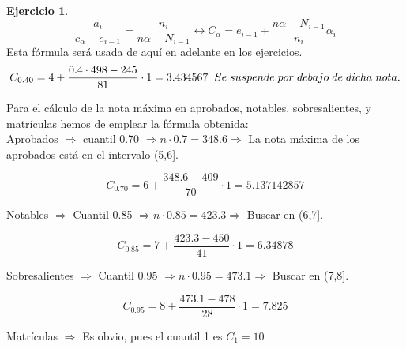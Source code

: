 \documentclass[a4paper, 12pt]{article}
\theoremstyle{definition}
\newtheorem{ej}{Ejercicio}
\begin{document}
\begin{ej}
  $$\frac{a_{i}}{c_{\alpha}-e_{i-1}} = \frac{n_{i}}{n\alpha - N_{i-1}} \longleftrightarrow C_{\alpha} = e_{i-1} + \frac{n\alpha - N_{i-1}}{n_{i}}\alpha_{i}$$
Esta fórmula será usada de aquí en adelante en los ejercicios.
\[
C_{0.40} = 4 + \frac{0.4 \cdot 498 -245}{81}\cdot 1 = 3.434567 \hspace{0.2cm} Se \hspace{0.1cm} suspende \hspace{0.1cm} por \hspace{0.1cm} debajo \hspace{0.1cm} de \hspace{0.1cm} dicha \hspace{0.1cm} nota.
\]

Para el cálculo de la nota máxima en aprobados, notables, sobresalientes, y matrículas hemos de emplear la fórmula obtenida: \\

Aprobados \(\Rightarrow\) cuantil 0.70 \(\Rightarrow n \cdot 0.7= 348.6 \Rightarrow\) La nota máxima de los aprobados está en el intervalo (5,6].

\[
C_{0.70} = 6 + \frac{348.6 - 409}{70} \cdot 1 = 5.137142857
\]

Notables \(\Rightarrow\) Cuantil 0.85 \(\Rightarrow n \cdot 0.85 = 423.3 \Rightarrow\) Buscar en (6,7].

\[
C_{0.85} = 7 + \frac{423.3 - 450}{41} \cdot 1 = 6.34878
\]

Sobresalientes \(\Rightarrow\) Cuantil 0.95 \(\Rightarrow n \cdot 0.95 = 473.1 \Rightarrow\) Buscar en (7,8].

\[
C_{0.95} = 8 + \frac{473.1 - 478}{28} \cdot 1 = 7.825
\]

Matrículas \(\Rightarrow\) Es obvio, pues el cuantil 1 es \(C_{1} = 10\)
\end{ej}
\end{document}
